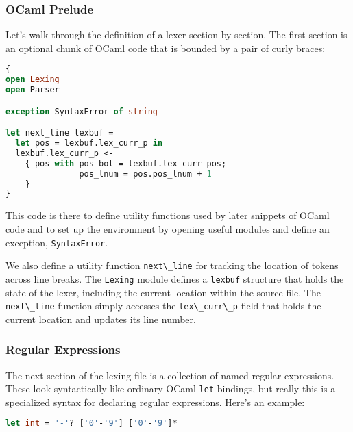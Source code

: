 \hypertarget{ocaml-prelude}{%
\subsubsection{OCaml Prelude}\label{ocaml-prelude}}

Let's walk through the definition of a lexer section by section. The
first section is an optional chunk of OCaml code that is bounded by a
pair of curly braces: 

\begin{lstlisting}[language=Caml]
{
open Lexing
open Parser

exception SyntaxError of string

let next_line lexbuf =
  let pos = lexbuf.lex_curr_p in
  lexbuf.lex_curr_p <-
    { pos with pos_bol = lexbuf.lex_curr_pos;
               pos_lnum = pos.pos_lnum + 1
    }
}
\end{lstlisting}

This code is there to define utility functions used by later snippets of
OCaml code and to set up the environment by opening useful modules and
define an exception, \passthrough{\lstinline!SyntaxError!}.

We also define a utility function \passthrough{\lstinline!next\_line!}
for tracking the location of tokens across line breaks. The
\passthrough{\lstinline!Lexing!} module defines a
\passthrough{\lstinline!lexbuf!} structure that holds the state of the
lexer, including the current location within the source file. The
\passthrough{\lstinline!next\_line!} function simply accesses the
\passthrough{\lstinline!lex\_curr\_p!} field that holds the current
location and updates its line number.

\hypertarget{regular-expressions}{%
\subsubsection{Regular Expressions}\label{regular-expressions}}

The next section of the lexing file is a collection of named regular
expressions. These look syntactically like ordinary OCaml
\passthrough{\lstinline!let!} bindings, but really this is a specialized
syntax for declaring regular expressions. Here's an example:

\begin{lstlisting}[language=Caml]
let int = '-'? ['0'-'9'] ['0'-'9']*
\end{lstlisting}


